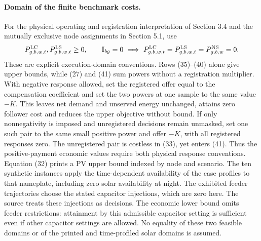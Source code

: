 \documentclass{article}
\begin{document}
\paragraph{Domain of the finite benchmark costs.}
For the physical operating and registration interpretation of Section 3.4 and
the mutually exclusive node assignments in Section 5.1, use
\[
 P^{\rm LC}_{g,b,w,t},P^{\rm LS}_{g,b,w,t}\ge0,\qquad
 \mathbb I_{bg}=0\ \Longrightarrow\ 
 P^{\rm LC}_{g,b,w,t}=P^{\rm LS}_{g,b,w,t}=P^{\rm NS}_{g,b,w}=0 .
\]
These are explicit execution-domain conventions. Rows (35)--(40) alone give
upper bounds, while (27) and (41) sum powers without a registration multiplier.
With negative response allowed, set the registered offer equal to the compensation
coefficient and set the two powers at one sample to the same value \(-K\).
This leaves net demand and unserved energy unchanged, attains zero follower
cost and reduces the upper objective without bound. If only nonnegativity is
imposed and unregistered decisions remain unmasked, set one such pair to
the same small positive power and offer \(-K\), with all registered responses
zero. The unregistered pair is costless in (33), yet enters (41). Thus the
positive-payment economic values require both physical response conventions.
Equation (32) prints a PV upper bound indexed by node and scenario. The
ten synthetic instances apply the time-dependent availability of the case
profiles to that nameplate, including zero solar availability at night.
The exhibited feeder trajectories choose the stated capacitor injections,
which are zero here. The source treats these injections as decisions. The
economic lower bound omits feeder restrictions: attainment by this admissible
capacitor setting is sufficient even if other capacitor settings are allowed.
No equality of these two feasible domains or of the printed and time-profiled
solar domains is assumed.
\end{document}
